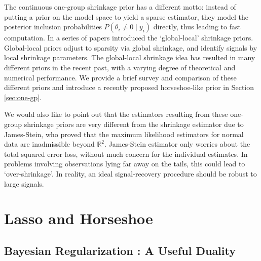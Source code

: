 \documentclass[11pt]{article}
\numberwithin{equation}{section}
\begin{document}
The continuous one-group shrinkage prior has a different motto: instead of putting a prior on the model space to yield a sparse estimator, they model the posterior inclusion probabilities $P(\theta_i \ne 0 \mid y_i)$ directly, thus leading to fast computation. In a series of papers \citet{carvalho2009handling,polson2010shrink, carvalho2010horseshoe, polson2012half} introduced the `global-local' shrinkage priors. Global-local priors adjust to sparsity via global shrinkage, and identify signals by local shrinkage parameters. The global-local shrinkage idea has resulted in many different priors in the recent past, with a varying degree of theoretical and numerical performance. We provide a brief survey and comparison of these different priors and introduce a recently proposed horseshoe-like prior in Section \ref{sec:one-gp}.   

We would also like to point out that the estimators resulting from these one-group shrinkage priors are very different from the shrinkage estimator due to James-Stein, who proved that the maximum likelihood estimators for normal data are inadmissible beyond $\mathbb{R}^2$. James-Stein estimator only worries about the total squared error loss, without much concern for the individual estimates. In problems involving observations lying far away on the tails, this could lead to `over-shrinkage'. In reality, an ideal signal-recovery procedure should be robust to large signals.


\section{Lasso and Horseshoe}
\subsection{Bayesian Regularization : A Useful Duality}
\end{document}
